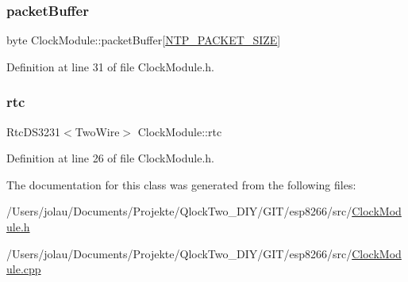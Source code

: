 \subsubsection{\texorpdfstring{packetBuffer}{packetBuffer}}
{\footnotesize\ttfamily byte Clock\+Module\+::packet\+Buffer\mbox{[}\mbox{\hyperlink{class_clock_module_ab12ec0e0e1a0a02861feae0272840cff}{N\+T\+P\+\_\+\+P\+A\+C\+K\+E\+T\+\_\+\+S\+I\+ZE}}\mbox{]}\hspace{0.3cm}{\ttfamily [private]}}



Definition at line 31 of file Clock\+Module.\+h.

\mbox{\label{class_clock_module_a191d985f5169622e48f7babba844bd60}} 
\subsubsection{\texorpdfstring{rtc}{rtc}}
{\footnotesize\ttfamily Rtc\+D\+S3231$<$Two\+Wire$>$ Clock\+Module\+::rtc\hspace{0.3cm}{\ttfamily [private]}}



Definition at line 26 of file Clock\+Module.\+h.



The documentation for this class was generated from the following files\+:\begin{DoxyCompactItemize}
\item 
/\+Users/jolau/\+Documents/\+Projekte/\+Qlock\+Two\+\_\+\+D\+I\+Y/\+G\+I\+T/esp8266/src/\mbox{\hyperlink{_clock_module_8h}{Clock\+Module.\+h}}\item 
/\+Users/jolau/\+Documents/\+Projekte/\+Qlock\+Two\+\_\+\+D\+I\+Y/\+G\+I\+T/esp8266/src/\mbox{\hyperlink{_clock_module_8cpp}{Clock\+Module.\+cpp}}\end{DoxyCompactItemize}
